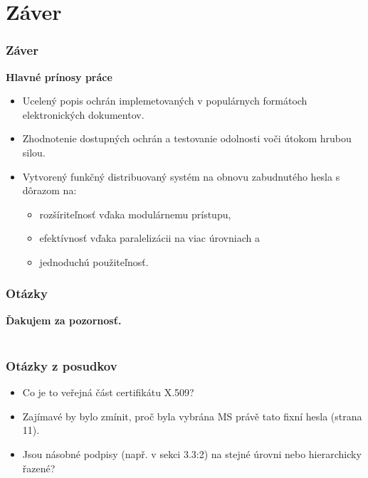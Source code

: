 \documentclass[xcolor=dvipsnames]{beamer}
\def\itemtitle#1{{\bfseries#1\smallskip}}
\begin{document}
\section{Záver}
\begin{frame}
	\frametitle{Záver}

	\itemtitle{Hlavné prínosy práce}
	\begin{itemize}
		\item Ucelený popis ochrán implemetovaných v populárnych formátoch elektronických dokumentov.
		\item Zhodnotenie dostupných ochrán a testovanie odolnosti voči útokom hrubou silou. 
		\item Vytvorený funkčný distribuovaný systém na obnovu zabudnutého hesla s dôrazom na:
		\begin{itemize}
			\item rozšíriteľnosť vďaka modulárnemu prístupu,
			\item efektívnosť vďaka paralelizácii na viac úrovniach a
			\item jednoduchú použiteľnosť.
		\end{itemize}
	\end{itemize}
\end{frame}


\begin{frame}
   \frametitle{Otázky}
 	\vspace*{\fill}

 	\begin{center} 		
 		\huge\bfseries{} Ďakujem za pozornosť.\\~\\
 	\end{center}
 	\vspace*{\fill}
 \end{frame}


\begin{frame}
	\frametitle{Otázky z posudkov}
	\begin{itemize}
		\item Co je to veřejná část certifikátu X.509?
		\item Zajímavé by bylo zmínit, proč byla vybrána MS právě tato fixní hesla (strana 11).
		\item Jsou násobné podpisy (např. v sekci 3.3:2) na stejné úrovni nebo hierarchicky řazené?
	\end{itemize}
\end{frame}
\end{document}
